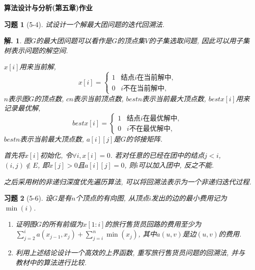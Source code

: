 \documentclass[a4paper,oneside,12pt]{ctexart}
\theoremstyle{plain}
\newtheorem{exercise}{习题}
\theoremstyle{nonumberplain}
\newtheorem{solution}{解.}
\theoremstyle{nonumberplain}
\begin{document}
    \begin{center}
        \bfseries\LARGE
        算法设计与分析(第五章)作业
    \end{center}

    \begin{exercise}[5-4]
        \label{ex:5.4}
        试设计一个解最大团问题的迭代回溯法.
    \end{exercise}

    \begin{solution}
        图$G$的最大团问题可以看作是$G$的顶点集$V$的子集选取问题, 因此可以用子集树表示问题的解空间.

        $x[i]$用来当前解,
        \begin{equation*}
           x[i]=\begin{cases}
            1& \text{结点$i$在当前解中},\\
            0 & \text{$i$不在当前解中},
        \end{cases}
        \end{equation*}
        $n$表示图$G$的顶点数, $cn$表示当前顶点数, $bestn$表示当前最大顶点数, 
        $bestx[i]$用来记录最优解,
        \begin{equation*}
            bestx[i]=\begin{cases}
                1& \text{结点$i$在最优解中},\\
                0 & \text{$i$不在最优解中},
            \end{cases}
        \end{equation*}
        $bestn$表示当前最大顶点数, $a[i][j]$是$G$的邻接矩阵.

        首先将$x[i]$初始化, 令$\forall i,x[i]=0$. 若对任意的已经在团中的结点$j<i$, $(i,j)\notin E$, 即$x[j]>0$且$a[i][j]=0$, 
        则$i$可以加入团中, 反之不能.

        之后采用树的非递归深度优先遍历算法, 可以将回溯法表示为一个非递归迭代过程.
    \end{solution}

    \begin{exercise}[5-6]
        \label{ex:5-6}
        设$G$是有$n$个顶点的有向图, 从顶点$i$发出的边的最小费用记为$\min(i)$.

        \begin{enumerate}[(1)]
            \item 证明图$G$的所有前缀为$x[1:i]$的旅行售货员回路的费用至少为$\sum_{j=2}^ia(x_{j-1},x_j)+\sum_{j=i}^n\min(x_j)$, 其中$a(u,v)$是边$(u,v)$的费用.
            \item 利用上述结论设计一个高效的上界函数, 重写旅行售货员问题的回溯法, 并与教材中的算法进行比较.
        \end{enumerate}
    \end{exercise}
\end{document}
